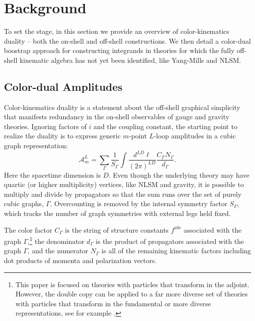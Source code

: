 \documentclass[11pt,letter]{article}
\begin{document}
\section{Background}\label{background}
To set the stage, in this section we provide an overview of
color-kinematics duality -- both the on-shell and off-shell
constructions. We then detail a color-dual boostrap approach for
constructing integrands in theories for which the fully off-shell kinematic
algebra has not yet been identified, like Yang-Mills and NLSM.
\subsection{Color-dual Amplitudes}\label{onShellCK}

Color-kinematics duality is a statement about the off-shell graphical
simplicity that manifests redundancy in the on-shell observables of
gauge and gravity theories. Ignoring factors of $i$ and the coupling
constant, the starting point to realize the duality is to express generic $m$-point $L$-loop amplitudes in a cubic graph representation:
\begin{equation}
  \mathcal{A}_m^L = \sum \limits_\Gamma \frac{1}{S_\Gamma} \int \frac{d^{LD}\ell}{(2\pi)^{LD}} \frac{C_\Gamma N_\Gamma}{d_\Gamma} .
  \label{eq:gen-amp}
\end{equation}
Here the spacetime dimension is $D$.  Even though the underlying
theory may have quartic (or higher multiplicity) vertices, like NLSM and gravity, it is
possible to multiply and divide by propagators so that the sum runs
over the set of purely cubic graphs, $\Gamma$.  Overcounting is removed by
the internal symmetry factor $S_\Gamma$, which tracks the number of
graph symmetries with external legs held fixed.  

The color factor
$C_\Gamma$ is the string of structure constants $f^{abc}$ associated
with the graph $\Gamma$,\footnote{This paper is focused on theories
  with particles that transform in the adjoint.  However, the double
  copy can be applied to a far more diverse set of theories with
  particles that transform in the fundamental or more diverse
  representations, see for example \cite{Johansson:2017srf,
    Johansson2014zca, Johansson:2015oia, Johansson:2019dnu, Carrasco:2020ywq,
    Carrasco:2023vjg}.}  the denominator $d_\Gamma$
is the product of propagators associated with the graph $\Gamma$, and
the numerator $N_\Gamma$ is all of the remaining kinematic factors
including dot products of momenta and polarization vectors.
\end{document}
